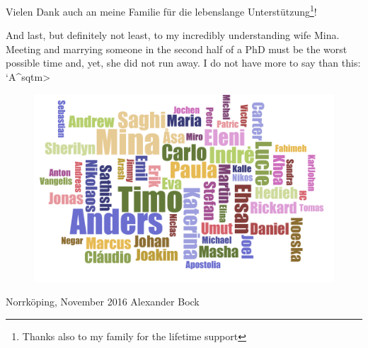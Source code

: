 Vielen Dank auch an meine Familie f\"ur die lebenslange Unterst\"utzung\footnote{Thanks also to my family for the lifetime support}!

And last, but definitely not least, to my incredibly understanding wife Mina. Meeting and marrying someone in the second half of a PhD must be the worst possible time and, yet, she did not run away. I do not have more to say than this: \<`A^sqtm>

\begin{figure}[hb]
\centering
\includegraphics[width=\linewidth]{figures/misc/wordcloud.pdf}
\end{figure}

\vfill
\hline
\hline

Norrk\"oping, November 2016 \hfill Alexander Bock
\vspace{2cm}
